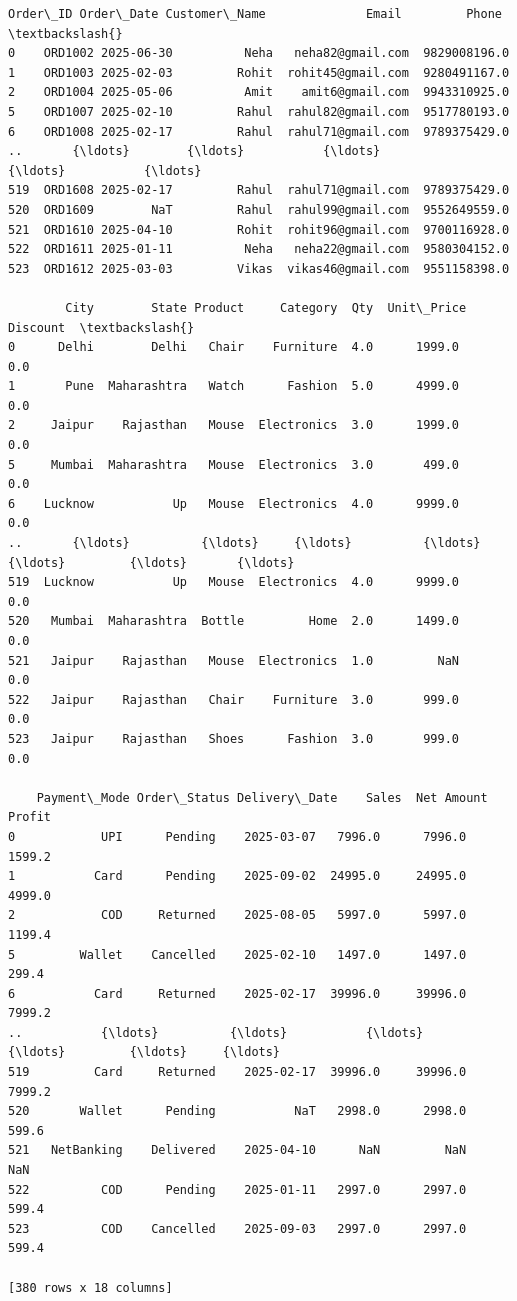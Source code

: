 \documentclass[11pt]{article}
\makeatletter
\newcommand{\boxspacing}{\kern\kvtcb@left@rule\kern\kvtcb@boxsep}
\newcommand{\prompt}[4]{
        {\ttfamily\llap{{\color{#2}[#3]:\hspace{3pt}#4}}\vspace{-\baselineskip}}
    }
\makeatother
\begin{document}
            \begin{tcolorbox}[breakable, size=fbox, boxrule=.5pt, pad at break*=1mm, opacityfill=0]
\prompt{Out}{outcolor}{42}{\boxspacing}
\begin{Verbatim}[commandchars=\\\{\}]
    Order\_ID Order\_Date Customer\_Name              Email         Phone  \textbackslash{}
0    ORD1002 2025-06-30          Neha   neha82@gmail.com  9829008196.0
1    ORD1003 2025-02-03         Rohit  rohit45@gmail.com  9280491167.0
2    ORD1004 2025-05-06          Amit    amit6@gmail.com  9943310925.0
5    ORD1007 2025-02-10         Rahul  rahul82@gmail.com  9517780193.0
6    ORD1008 2025-02-17         Rahul  rahul71@gmail.com  9789375429.0
..       {\ldots}        {\ldots}           {\ldots}                {\ldots}           {\ldots}
519  ORD1608 2025-02-17         Rahul  rahul71@gmail.com  9789375429.0
520  ORD1609        NaT         Rahul  rahul99@gmail.com  9552649559.0
521  ORD1610 2025-04-10         Rohit  rohit96@gmail.com  9700116928.0
522  ORD1611 2025-01-11          Neha   neha22@gmail.com  9580304152.0
523  ORD1612 2025-03-03         Vikas  vikas46@gmail.com  9551158398.0

        City        State Product     Category  Qty  Unit\_Price  Discount  \textbackslash{}
0      Delhi        Delhi   Chair    Furniture  4.0      1999.0       0.0
1       Pune  Maharashtra   Watch      Fashion  5.0      4999.0       0.0
2     Jaipur    Rajasthan   Mouse  Electronics  3.0      1999.0       0.0
5     Mumbai  Maharashtra   Mouse  Electronics  3.0       499.0       0.0
6    Lucknow           Up   Mouse  Electronics  4.0      9999.0       0.0
..       {\ldots}          {\ldots}     {\ldots}          {\ldots}  {\ldots}         {\ldots}       {\ldots}
519  Lucknow           Up   Mouse  Electronics  4.0      9999.0       0.0
520   Mumbai  Maharashtra  Bottle         Home  2.0      1499.0       0.0
521   Jaipur    Rajasthan   Mouse  Electronics  1.0         NaN       0.0
522   Jaipur    Rajasthan   Chair    Furniture  3.0       999.0       0.0
523   Jaipur    Rajasthan   Shoes      Fashion  3.0       999.0       0.0

    Payment\_Mode Order\_Status Delivery\_Date    Sales  Net Amount  Profit
0            UPI      Pending    2025-03-07   7996.0      7996.0  1599.2
1           Card      Pending    2025-09-02  24995.0     24995.0  4999.0
2            COD     Returned    2025-08-05   5997.0      5997.0  1199.4
5         Wallet    Cancelled    2025-02-10   1497.0      1497.0   299.4
6           Card     Returned    2025-02-17  39996.0     39996.0  7999.2
..           {\ldots}          {\ldots}           {\ldots}      {\ldots}         {\ldots}     {\ldots}
519         Card     Returned    2025-02-17  39996.0     39996.0  7999.2
520       Wallet      Pending           NaT   2998.0      2998.0   599.6
521   NetBanking    Delivered    2025-04-10      NaN         NaN     NaN
522          COD      Pending    2025-01-11   2997.0      2997.0   599.4
523          COD    Cancelled    2025-09-03   2997.0      2997.0   599.4

[380 rows x 18 columns]
\end{Verbatim}
\end{tcolorbox}
        
\end{document}

